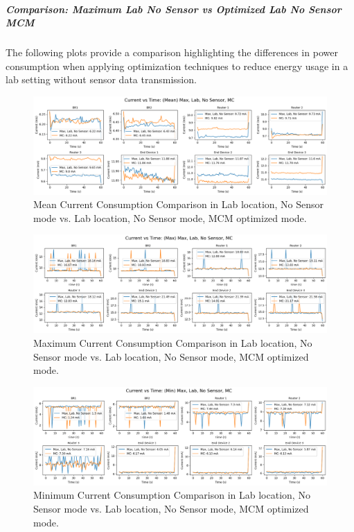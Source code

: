 \subparagraph{Comparison: Maximum Lab No Sensor vs Optimized Lab No Sensor MCM}
The following plots provide a comparison highlighting the differences in power consumption when applying optimization techniques to reduce energy usage in a lab setting without sensor data transmission.

\begin{figure}[H]
  \centering
  \includegraphics[width=1\textwidth]{images/research_results/current_consumption_analysis/optimized/lab/no_sensor/mc/comparison/mean_comparison_lab_no-sensor_vs_lab_no-sensor_mc.png}
    \caption{Mean Current Consumption Comparison in Lab location, No Sensor mode vs. Lab location, No Sensor mode, MCM optimized mode.}
    \label{fig:mean_comparison_lab_no-sensor_vs_lab_no-sensor_mc}
\end{figure}

\begin{figure}[H]
  \centering
  \includegraphics[width=1\textwidth]{images/research_results/current_consumption_analysis/optimized/lab/no_sensor/mc/comparison/max_comparison_lab_no-sensor_vs_lab_no-sensor_mc.png}
    \caption{Maximum Current Consumption Comparison in Lab location, No Sensor mode vs. Lab location, No Sensor mode, MCM optimized mode.}
    \label{fig:max_comparison_lab_no-sensor_vs_lab_no-sensor_mc}
\end{figure}

\begin{figure}[H]
  \centering
  \includegraphics[width=1\textwidth]{images/research_results/current_consumption_analysis/optimized/lab/no_sensor/mc/comparison/min_comparison_lab_no-sensor_vs_lab_no-sensor_mc.png}
    \caption{Minimum Current Consumption Comparison in Lab location, No Sensor mode vs. Lab location, No Sensor mode, MCM optimized mode.}
    \label{fig:min_comparison_lab_no-sensor_vs_lab_no-sensor_mc}
\end{figure}

